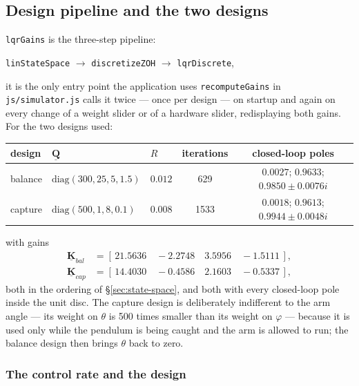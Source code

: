 \documentclass[12pt]{article}
\newcommand{\mb}[1]{\underline{\mathbf{#1}}}
\begin{document}
\subsection{Design pipeline and the two designs}
\label{sec:design-pipeline}

\texttt{lqrGains} is the three-step pipeline:
\vspace{5pt}
\par \texttt{linStateSpace} $\rightarrow$ \texttt{discretizeZOH} $\rightarrow$ \texttt{lqrDiscrete}, 
\vspace{5pt}
\par\noindent it is the only entry point the application uses \texttt{recomputeGains} in \texttt{js/simulator.js} calls it twice --- once per design --- on startup and again on every change of a weight slider or of a hardware slider, redisplaying both gains. For the two designs used:

\begin{center}
\small
\begin{tabular}{l l l c c}
\hline
design & $\mb{Q}$ & $R$ & iterations & closed-loop poles \\
\hline
balance & $\text{diag}(300, 25, 5, 1.5)$ & $0.012$ & 629 & $0.0027$; $0.9633$; $0.9850 \pm 0.0076i$ \\
capture & $\text{diag}(500, 1, 8, 0.1)$ & $0.008$ & 1533 & $0.0018$; $0.9613$; $0.9944 \pm 0.0048i$ \\
\hline
\end{tabular}
\end{center}

 with gains
\[
\begin{aligned}
\mb{K}_{bal} &= [\,21.5636 \quad -2.2748 \quad 3.5956 \quad -1.5111\,], \\
\mb{K}_{cap} &= [\,14.4030 \quad -0.4586 \quad 2.1603 \quad -0.5337\,],
\end{aligned}
\]
both in the ordering of \S\ref{sec:state-space}, and both with every closed-loop pole inside the unit disc. The capture design is deliberately indifferent to the arm angle --- its weight on $\theta$ is 500 times smaller than its weight on $\varphi$ --- because it is used only while the pendulum is being caught and the arm is allowed to run; the balance design then brings $\theta$ back to zero.

\subsubsection{The control rate and the design}
\label{sec:control-rate}
\end{document}
